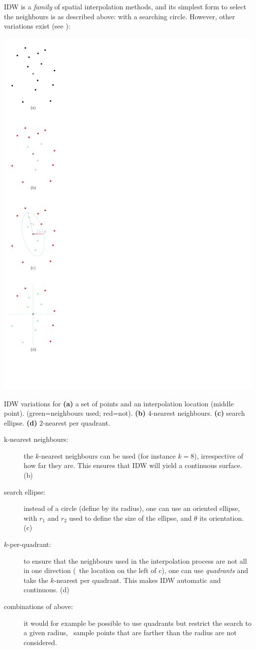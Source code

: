 IDW is a \emph{family} of spatial interpolation methods, and its simplest form to select the neighbours is as described above: with a searching circle.
However, other variations exist (see ):
\begin{marginfigure}
  \centering
  \includegraphics[width=0.6\linewidth,page=1]{figs/idwvar}%
  \caption{IDW variations for \textbf{(a)} a set of points and an interpolation location (middle point). (green=neighbours used; red=not). \textbf{(b)} 4-nearest neighbours. \textbf{(c)} search ellipse. \textbf{(d)} 2-nearest per quadrant.}%
\end{marginfigure}

\begin{description}
  \item[k-nearest neighbours:] the $k$-nearest neighbours can be used (for instance $k=8$), irrespective of how far they are. This ensures that IDW will yield a continuous surface. (b)
  \item[search ellipse:] instead of a circle (define by its radius), one can use an oriented ellipse, with $r_1$ and $r_2$ used to define the size of the ellipse, and $\theta$ its orientation. (c)
  \item[$k$-per-quadrant:] to ensure that the neighbours used in the interpolation process are not all in one direction (\eg\ the location on the left of c), one can use \emph{quadrants} and take the $k$-nearest per quadrant. This makes IDW automatic and continuous. (d)
  \item[combinations of above:] it would for example be possible to use quadrants but restrict the search to a given radius, \ie\ sample points that are farther than the radius are not considered.
\end{description}



